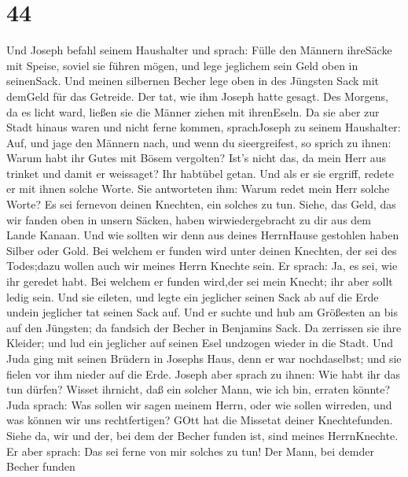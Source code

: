 \hypertarget{section-43}{%
\section{44}\label{section-43}}

 Und Joseph befahl seinem Haushalter und sprach: Fülle den
Männern ihreSäcke mit Speise, soviel sie führen mögen, und lege
jeglichem sein Geld oben in seinenSack.  Und meinen
silbernen Becher lege oben in des Jüngsten Sack mit demGeld für das
Getreide. Der tat, wie ihm Joseph hatte gesagt.  Des
Morgens, da es licht ward, ließen sie die Männer ziehen mit ihrenEseln.
 Da sie aber zur Stadt hinaus waren und nicht ferne kommen,
sprachJoseph zu seinem Haushalter: Auf, und jage den Männern nach, und
wenn du sieergreifest, so sprich zu ihnen: Warum habt ihr Gutes mit
Bösem vergolten?  Ist's nicht das, da mein Herr aus trinket
und damit er weissaget? Ihr habtübel getan.  Und als er sie
ergriff, redete er mit ihnen solche Worte.  Sie antworteten
ihm: Warum redet mein Herr solche Worte? Es sei fernevon deinen
Knechten, ein solches zu tun.  Siehe, das Geld, das wir
fanden oben in unsern Säcken, haben wirwiedergebracht zu dir aus dem
Lande Kanaan. Und wie sollten wir denn aus deines HerrnHause gestohlen
haben Silber oder Gold.  Bei welchem er funden wird unter
deinen Knechten, der sei des Todes;dazu wollen auch wir meines Herrn
Knechte sein.  Er sprach: Ja, es sei, wie ihr geredet habt.
Bei welchem er funden wird,der sei mein Knecht; ihr aber sollt ledig
sein.  Und sie eileten, und legte ein jeglicher seinen Sack
ab auf die Erde undein jeglicher tat seinen Sack auf.  Und
er suchte und hub am Größesten an bis auf den Jüngsten; da fandsich der
Becher in Benjamins Sack.  Da zerrissen sie ihre Kleider;
und lud ein jeglicher auf seinen Esel undzogen wieder in die Stadt.
 Und Juda ging mit seinen Brüdern in Josephs Haus, denn er
war nochdaselbst; und sie fielen vor ihm nieder auf die Erde.
 Joseph aber sprach zu ihnen: Wie habt ihr das tun dürfen?
Wisset ihrnicht, daß ein solcher Mann, wie ich bin, erraten könnte?
 Juda sprach: Was sollen wir sagen meinem Herrn, oder wie
sollen wirreden, und was können wir uns rechtfertigen? GOtt hat die
Missetat deiner Knechtefunden. Siehe da, wir und der, bei dem der Becher
funden ist, sind meines HerrnKnechte.  Er aber sprach: Das
sei ferne von mir solches zu tun! Der Mann, bei demder Becher funden
